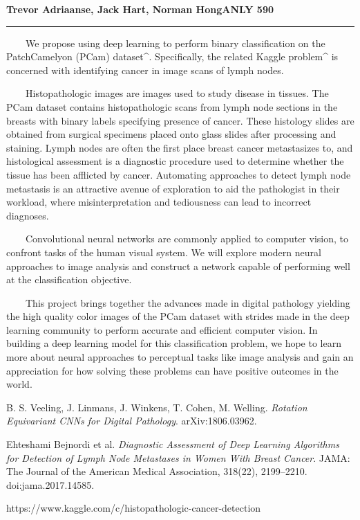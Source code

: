 \documentclass[11pt]{article}
\newcommand{\name}{Trevor Adriaanse, Jack Hart, Norman Hong}
\newcommand{\topic}{ANLY 590}
\newcommand{\myheader}[1]{
\newpage
\noindent
{\bf \name \hfill \topic \vspace{1mm}}
\hrule \medskip
}
\begin{document}
 

\myheader

{\large {\bf Initial Project Proposal: Computer Vision for Cancer Detection}}

~~~~We propose using deep learning to perform binary classification on the PatchCamelyon (PCam) dataset^{\text{[1][2]}}. Specifically, the related Kaggle problem^{\text{[3]}} is concerned with identifying cancer in image scans of lymph nodes.

~~~~Histopathologic images are images used to study disease in tissues. The PCam dataset contains histopathologic scans from lymph node sections in the breasts with binary labels specifying presence of cancer. These histology slides are obtained from surgical specimens placed onto glass slides after processing and staining. Lymph nodes are often the first place breast cancer metastasizes to, and histological assessment is a diagnostic procedure used to determine whether the tissue has been afflicted by cancer. Automating approaches to detect lymph node metastasis is an attractive avenue of exploration to aid the pathologist in their workload, where misinterpretation and tediousness can lead to incorrect diagnoses.

~~~~Convolutional neural networks are commonly applied to computer vision, to confront tasks of the human visual system. We will explore modern neural approaches to image analysis and construct a network capable of performing well at the classification objective. 

~~~~This project brings together the advances made in digital pathology yielding the high quality color images of the PCam dataset with strides made in the deep learning community to perform accurate and efficient computer vision. In building a deep learning model for this classification problem, we hope to learn more about neural approaches to perceptual tasks like image analysis and gain an appreciation for how solving these problems can have positive outcomes in the world.

\begin{thebibliography}{9}

B. S. Veeling, J. Linmans, J. Winkens, T. Cohen, M. Welling.
\textit{Rotation Equivariant CNNs for Digital Pathology}.
arXiv:1806.03962.

Ehteshami Bejnordi et al.
\textit{Diagnostic Assessment of Deep Learning Algorithms for Detection of Lymph Node Metastases in Women With Breast Cancer}.
JAMA: The Journal of the American Medical Association, 318(22), 2199–2210. doi:jama.2017.14585.

https://www.kaggle.com/c/histopathologic-cancer-detection


\end{thebibliography}
\end{document}
